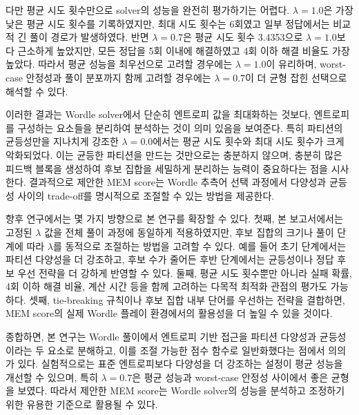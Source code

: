 \documentclass[11pt]{article}
\begin{document}
다만 평균 시도 횟수만으로 solver의 성능을 완전히 평가하기는 어렵다.
$\lambda = 1.0$은 가장 낮은 평균 시도 횟수를 기록하였지만, 최대 시도 횟수는 6회였고 일부 정답에서는 비교적 긴 풀이 경로가 발생하였다.
반면 $\lambda = 0.7$은 평균 시도 횟수 3.4353으로 $\lambda = 1.0$보다 근소하게 높았지만,
모든 정답을 5회 이내에 해결하였고 4회 이하 해결 비율도 가장 높았다.
따라서 평균 성능을 최우선으로 고려할 경우에는 $\lambda = 1.0$이 유리하며,
worst-case 안정성과 풀이 분포까지 함께 고려할 경우에는 $\lambda = 0.7$이 더 균형 잡힌 선택으로 해석할 수 있다.

이러한 결과는 Wordle solver에서 단순히 엔트로피 값을 최대화하는 것보다,
엔트로피를 구성하는 요소들을 분리하여 분석하는 것이 의미 있음을 보여준다.
특히 파티션의 균등성만을 지나치게 강조한 $\lambda = 0.0$에서는 평균 시도 횟수와 최대 시도 횟수가 크게 악화되었다.
이는 균등한 파티션을 만드는 것만으로는 충분하지 않으며,
충분히 많은 피드백 블록을 생성하여 후보 집합을 세밀하게 분리하는 능력이 중요하다는 점을 시사한다.
결과적으로 제안한 MEM score는 Wordle 추측어 선택 과정에서 다양성과 균등성 사이의 trade-off를 명시적으로 조절할 수 있는 방법을 제공한다.

향후 연구에서는 몇 가지 방향으로 본 연구를 확장할 수 있다.
첫째, 본 보고서에서는 고정된 $\lambda$ 값을 전체 풀이 과정에 동일하게 적용하였지만,
후보 집합의 크기나 풀이 단계에 따라 $\lambda$를 동적으로 조절하는 방법을 고려할 수 있다.
예를 들어 초기 단계에서는 파티션 다양성을 더 강조하고,
후보 수가 줄어든 후반 단계에서는 균등성이나 정답 후보 우선 전략을 더 강하게 반영할 수 있다.
둘째, 평균 시도 횟수뿐만 아니라 실패 확률, 4회 이하 해결 비율, 계산 시간 등을 함께 고려하는 다목적 최적화 관점의 평가도 가능하다.
셋째, tie-breaking 규칙이나 후보 집합 내부 단어를 우선하는 전략을 결합하면,
MEM score의 실제 Wordle 플레이 환경에서의 활용성을 더 높일 수 있을 것이다.

종합하면, 본 연구는 Wordle 풀이에서 엔트로피 기반 접근을 파티션 다양성과 균등성이라는 두 요소로 분해하고,
이를 조절 가능한 점수 함수로 일반화했다는 점에서 의의가 있다.
실험적으로는 표준 엔트로피보다 다양성을 더 강조하는 설정이 평균 성능을 개선할 수 있으며,
특히 $\lambda = 0.7$은 평균 성능과 worst-case 안정성 사이에서 좋은 균형을 보였다.
따라서 제안한 MEM score는 Wordle solver의 성능을 분석하고 조정하기 위한 유용한 기준으로 활용될 수 있다.
\end{document}
